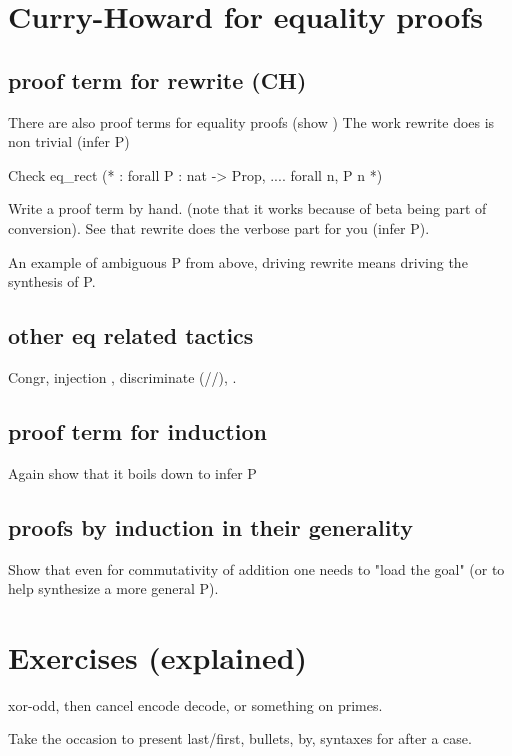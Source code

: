 \section{Curry-Howard for equality proofs}

\subsection{proof term for rewrite (CH)}

There are also proof terms for equality proofs (show )
The work rewrite does is non trivial (infer P)

\begin{coq}{}
Check eq_rect (* : forall P : nat -> Prop, .... forall n, P n *)
\end{coq}

Write a proof term by hand.
(note that it works because of beta being part of conversion).
See that rewrite does the verbose part for you (infer P).

An example of ambiguous P from above, driving rewrite means driving the
synthesis of P.

\subsection{other eq related tactics}

Congr, injection \C{[= ]}, discriminate (//), \C{->}.


\subsection{proof term for induction}

Again show that it boils down to infer P


\subsection{proofs by induction in their generality}

Show that even for commutativity of addition one needs to
"load the goal" (or to help synthesize a more general P).


\section{Exercises (explained)}

xor-odd, then cancel encode decode, or something on primes.

Take the occasion to present last/first, bullets, by, syntaxes for
\C{=> [|IH x xs]} after a case.
